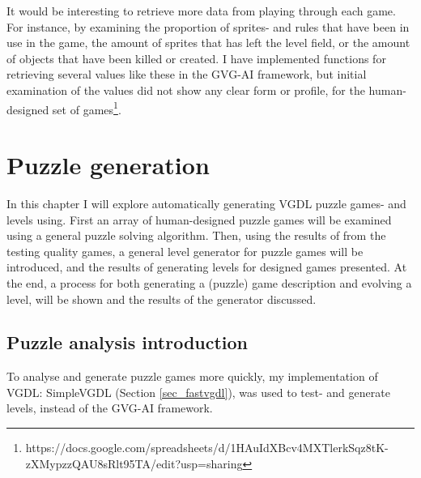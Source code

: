 \documentclass[a4paper,titlepage,final]{report}
\begin{document}
It would be interesting to retrieve more data from playing through each game.
For instance, by examining the proportion of sprites- and rules that have been in use in the game, the amount of sprites that has left the level field, or the amount of objects that have been killed or created.
I have implemented functions for retrieving several values like these in the GVG-AI framework, but initial examination of the values did not show any clear form or profile, for the human-designed set of games\footnote{https://docs.google.com/spreadsheets/d/1HAuIdXBcv4MXTlerkSqz8tK-zXMypzzQAU8sRlt95TA/edit?usp=sharing}.




\chapter{Puzzle generation}
\label{ch_task3}
In this chapter I will explore automatically generating VGDL puzzle games- and levels using.
First an array of human-designed puzzle games will be examined using a general puzzle solving algorithm.
Then, using the results of from the testing quality games, a general level generator for puzzle games will be introduced, and the results of generating levels for designed games presented.
At the end, a process for both generating a (puzzle) game description and evolving a level, will be shown and the results of the generator discussed.

\section{Puzzle analysis introduction}
\label{sec_task3intro}
To analyse and generate puzzle games more quickly, my implementation of VGDL: SimpleVGDL (Section \ref{sec_fastvgdl}), was used to test- and generate levels, instead of the GVG-AI framework.


\end{document}
